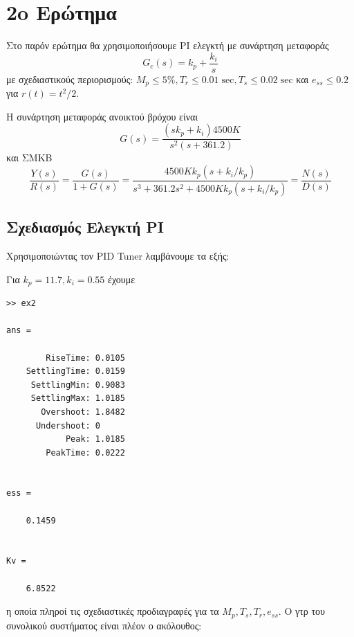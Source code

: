 \documentclass[a4paper,oneside, 10pt]{article}
\begin{document}
\section*{2o Ερώτημα} 

Στο παρόν ερώτημα θα χρησιμοποιήσουμε PI ελεγκτή με συνάρτηση μεταφοράς $$G_c(s) = k_p + \frac {k_i} s$$ με σχεδιαστικούς περιορισμούς: $M_p \le 5\%, T_r \le 0.01 \; \mathrm {sec}, T_s \le 0.02 \; \mathrm{sec}$ και $e_{ss} \le 0.2$ για $r(t) = t^2 / 2$. 

Η συνάρτηση μεταφοράς ανοικτού βρόχου είναι $$G(s) = \frac { (sk_p + k_i)4500K  } {s^2 (s + 361.2)} $$ και ΣΜΚΒ $$\frac {Y(s)} {R(s)}= \frac {G(s)} {1 + G(s)} = \frac { 4500Kk_p ( s + k_i / k_p )   } {  s^3 + 361.2s^2 + 4500Kk_p (s + k_i / k_p) } = \frac {N(s)}{D(s)}$$

\subsection*{Σχεδιασμός Ελεγκτή PI}
Χρησιμοποιώντας τον PID Tuner λαμβάνουμε τα εξής:

Για $k_p = 11.7, k_i = 0.55$ έχουμε 

\begin{verbatim}
>> ex2

ans = 

        RiseTime: 0.0105
    SettlingTime: 0.0159
     SettlingMin: 0.9083
     SettlingMax: 1.0185
       Overshoot: 1.8482
      Undershoot: 0
            Peak: 1.0185
        PeakTime: 0.0222


ess =

    0.1459


Kv =

    6.8522
\end{verbatim}  

η οποία πληροί τις σχεδιαστικές προδιαγραφές για τα $M_p, T_s, T_r, e_{ss}$. Ο γτρ του συνολικού συστήματος είναι πλέον ο ακόλουθος:
\end{document}
